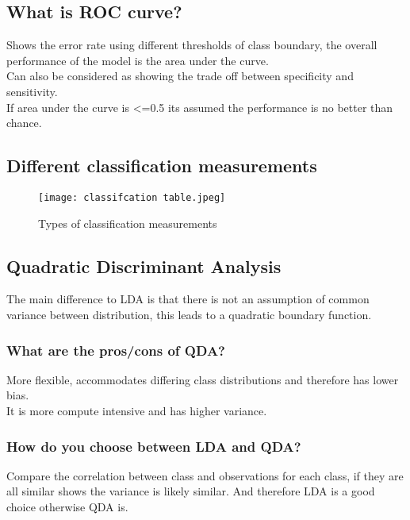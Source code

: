 \documentclass[11pt]{scrartcl} %
\begin{document}
\subsection{What is ROC curve?}

Shows the error rate using different thresholds of class boundary, the overall performance of the model is the
area under the curve.\\

Can also be considered as showing the trade off between specificity and sensitivity.\\

If area under the curve is <=0.5 its assumed the performance is no better than chance.

\subsection{Different classification measurements}

\begin{figure}[h] %
	\centering
	\texttt{[image: classifcation table.jpeg]} %
	\caption{Types of classification measurements}
\end{figure}

\subsection{Quadratic Discriminant Analysis}

The main difference to LDA is that there is not an assumption of common variance between distribution,
this leads to a quadratic boundary function. 

\subsubsection{What are the pros/cons of QDA?}

More flexible, accommodates differing class distributions and therefore has lower bias.\\

It is more compute intensive and has higher variance.

\subsubsection{How do you choose between LDA and QDA?}

Compare the correlation between class and observations for each class, if they are all similar shows
the variance is likely similar. And therefore LDA is a good choice otherwise QDA is.
\end{document}
